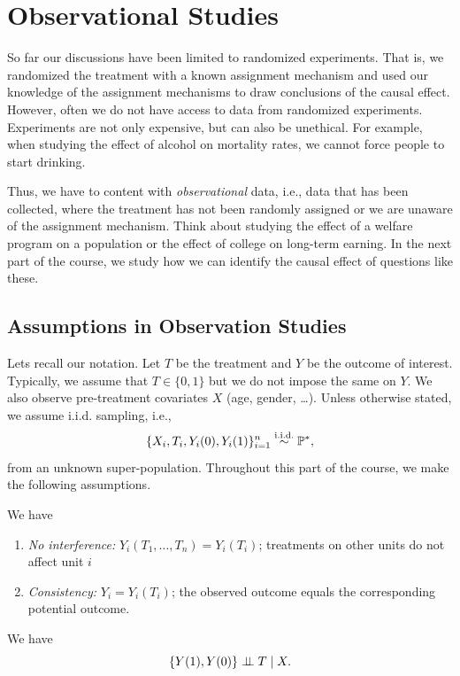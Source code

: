\documentclass[11pt]{exam}
\begin{document}

\begingroup\small

\section{Observational Studies}
So far our discussions have been limited to randomized experiments. That is, we randomized the treatment with a known assignment mechanism and used our knowledge of the assignment mechanisms to draw conclusions of the causal effect. However, often we do not have access to data from randomized experiments. Experiments are not only expensive, but can also be unethical. For example, when studying the effect of alcohol on mortality rates, we cannot force people to start drinking. 

Thus, we have to content with \emph{observational} data, i.e., data that has been collected, where the treatment has not been randomly assigned or we are unaware of the assignment mechanism. Think about studying the effect of a welfare program on a population or the effect of college on long-term earning. In the next part of the course, we study how we can identify the causal effect of questions like these.

\subsection{Assumptions in Observation Studies}
Lets recall our notation. Let $T$ be the treatment and $Y$ be the outcome of interest. Typically, we assume that $T \in \{0, 1\}$ but we do not impose the same on $Y$. We also observe pre-treatment covariates $X$ (age, gender, \ldots). Unless otherwise stated, we assume i.i.d. sampling, i.e.,
\[
    \{X_i, T_i, Y_i(0), Y_i(1)\}_{i=1}^n \overset{\text{i.i.d.}}{\sim} \mathbb{P}^\ast,
\]
from an unknown super-population. Throughout this part of the course, we make the following assumptions.
\begin{assumption}[SUTVA]\label{ass:sutva}
We have 
\begin{enumerate}
    \item \emph{No interference:} $Y_i(T_1,\dots,T_n)=Y_i(T_i)$; treatments on other units do not affect unit $i$
    \item \emph{Consistency:} $Y_i = Y_i(T_i)$; the observed outcome equals the corresponding potential outcome.
\end{enumerate}
\end{assumption}

\begin{assumption}\label{ass:strong_ignorability}
    We have
    \[
    \{Y(1), Y(0)\} \perp\!\!\!\perp T \mid X.
    \]
\end{assumption}
\end{document}

